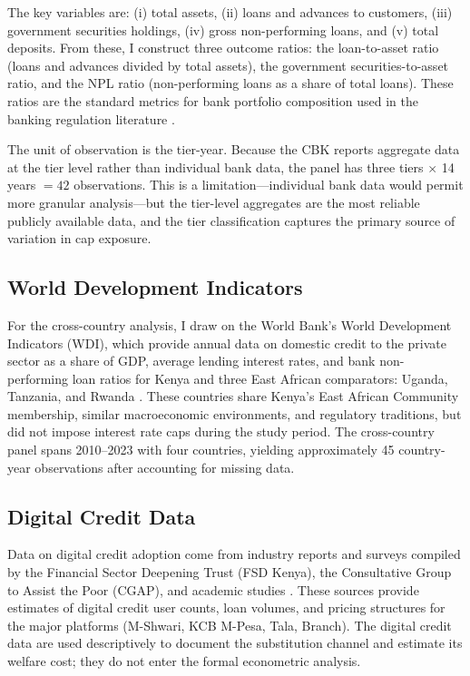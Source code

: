 \documentclass[12pt]{article}
\begin{document}
The key variables are: (i) total assets, (ii) loans and advances to customers, (iii) government securities holdings, (iv) gross non-performing loans, and (v) total deposits. From these, I construct three outcome ratios: the loan-to-asset ratio (loans and advances divided by total assets), the government securities-to-asset ratio, and the NPL ratio (non-performing loans as a share of total loans). These ratios are the standard metrics for bank portfolio composition used in the banking regulation literature \citep{degryse2009microeconometrics}.

The unit of observation is the tier-year. Because the CBK reports aggregate data at the tier level rather than individual bank data, the panel has three tiers $\times$ 14 years $= 42$ observations. This is a limitation---individual bank data would permit more granular analysis---but the tier-level aggregates are the most reliable publicly available data, and the tier classification captures the primary source of variation in cap exposure.

\subsection{World Development Indicators}

For the cross-country analysis, I draw on the World Bank's World Development Indicators (WDI), which provide annual data on domestic credit to the private sector as a share of GDP, average lending interest rates, and bank non-performing loan ratios for Kenya and three East African comparators: Uganda, Tanzania, and Rwanda \citep{worldbank2024wdi}. These countries share Kenya's East African Community membership, similar macroeconomic environments, and regulatory traditions, but did not impose interest rate caps during the study period. The cross-country panel spans 2010--2023 with four countries, yielding approximately 45 country-year observations after accounting for missing data.

\subsection{Digital Credit Data}

Data on digital credit adoption come from industry reports and surveys compiled by the Financial Sector Deepening Trust (FSD Kenya), the Consultative Group to Assist the Poor (CGAP), and academic studies \citep{totolo2018digital, bharadwaj2019fintech}. These sources provide estimates of digital credit user counts, loan volumes, and pricing structures for the major platforms (M-Shwari, KCB M-Pesa, Tala, Branch). The digital credit data are used descriptively to document the substitution channel and estimate its welfare cost; they do not enter the formal econometric analysis.
\end{document}
